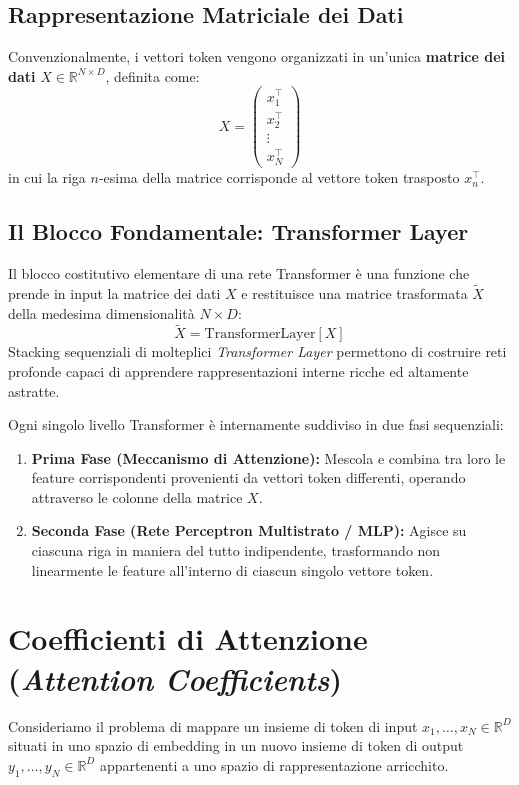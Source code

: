 \subsection{Rappresentazione Matriciale dei Dati}
Convenzionalmente, i vettori token vengono organizzati in un'unica \textbf{matrice dei dati} $X \in \mathbb{R}^{N \times D}$, definita come:
\begin{equation}
X = \begin{pmatrix}
x_1^\top \\
x_2^\top \\
\vdots \\
x_N^\top
\end{pmatrix}
\end{equation}
in cui la riga $n$-esima della matrice corrisponde al vettore token trasposto $x_n^\top$.

\subsection{Il Blocco Fondamentale: Transformer Layer}
Il blocco costitutivo elementare di una rete Transformer è una funzione che prende in input la matrice dei dati $X$ e restituisce una matrice trasformata $\tilde{X}$ della medesima dimensionalità $N \times D$:
\begin{equation}
\tilde{X} = \text{TransformerLayer}[X]
\end{equation}
Stacking sequenziali di molteplici \textit{Transformer Layer} permettono di costruire reti profonde capaci di apprendere rappresentazioni interne ricche ed altamente astratte.

Ogni singolo livello Transformer è internamente suddiviso in due fasi sequenziali:
\begin{enumerate}
    \item \textbf{Prima Fase (Meccanismo di Attenzione):} Mescola e combina tra loro le feature corrispondenti provenienti da vettori token differenti, operando attraverso le colonne della matrice $X$.
    \item \textbf{Seconda Fase (Rete Perceptron Multistrato / MLP):} Agisce su ciascuna riga in maniera del tutto indipendente, trasformando non linearmente le feature all'interno di ciascun singolo vettore token.
\end{enumerate}

\section{Coefficienti di Attenzione (\textit{Attention Coefficients})}
Consideriamo il problema di mappare un insieme di token di input $x_1, \dots, x_N \in \mathbb{R}^D$ situati in uno spazio di embedding in un nuovo insieme di token di output $y_1, \dots, y_N \in \mathbb{R}^D$ appartenenti a uno spazio di rappresentazione arricchito.

